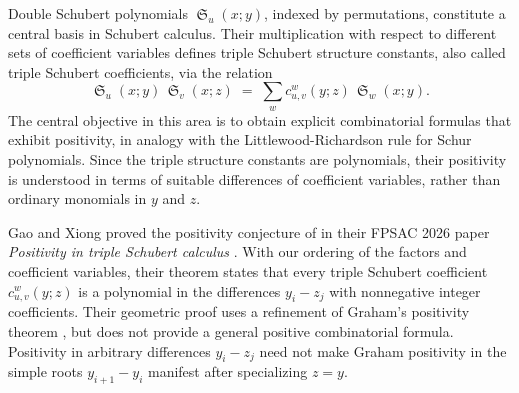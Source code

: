 \documentclass[reqno]{amsart}
\theoremstyle{definition}
\theoremstyle{remark}
\numberwithin{equation}{subsection}
\DeclareMathOperator{\sch}{\mathfrak{S}}
\begin{document}



Double Schubert polynomials $\sch_u(x;y)$, indexed by permutations, constitute a central basis in Schubert calculus. Their multiplication with respect to different sets of coefficient variables defines triple Schubert structure constants, also called triple Schubert coefficients, via the relation
\begin{equation*}
	\sch_u(x;y)\,\sch_v(x;z)\;=\;\sum_w c^w_{u,v}(y;z)\,\sch_w(x;y).
\end{equation*}
The central objective in this area is to obtain explicit combinatorial formulas that exhibit positivity, in analogy with the Littlewood-Richardson rule for Schur polynomials. Since the triple structure constants are polynomials, their positivity is understood in terms of suitable differences of coefficient variables, rather than ordinary monomials in $y$ and $z$.

Gao and Xiong proved the positivity conjecture of \cite[Conjecture~1.1]{samuelmolev} in their FPSAC 2026 paper \emph{Positivity in triple Schubert calculus} \cite[Theorem~1.1]{gao2025grahampositivitytripleschubert}. With our ordering of the factors and coefficient variables, their theorem states that every triple Schubert coefficient $c_{u,v}^w(y;z)$ is a polynomial in the differences $y_i-z_j$ with nonnegative integer coefficients. Their geometric proof uses a refinement of Graham's positivity theorem \cite{graham2001positivity}, but does not provide a general positive combinatorial formula. Positivity in arbitrary differences $y_i-z_j$ need not make Graham positivity in the simple roots $y_{i+1}-y_i$ manifest after specializing $z=y$.
\end{document}
